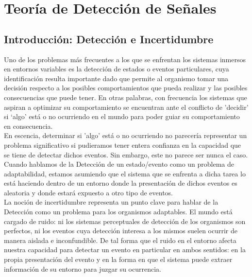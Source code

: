 
\chapter{Teoría de Detección de Señales} %

\label{Cap_SDT} %


\newcommand{\keyword}[1]{\textbf{#1}}
\newcommand{\tabhead}[1]{\textbf{#1}}
\newcommand{\code}[1]{\texttt{#1}}
\newcommand{\file}[1]{\texttt{\bfseries#1}}
\newcommand{\option}[1]{\texttt{\itshape#1}}


\section{Introducción: Detección e Incertidumbre}

Uno de los problemas más frecuentes a los que se enfrentan los sistemas inmersos en entornos variables es la detección de estados o eventos particulares, cuya identificación resulta importante dado que permite al organismo tomar una decisión respecto a los posibles comportamientos que pueda realizar y las posibles consecuencias que puede tener. En otras palabras, con frecuencia los sistemas que aspiran a optimizar su comportamiento se encuentran ante el conflicto de 'decidir' si ‘algo’ está o no ocurriendo en el mundo para poder guiar su comportamiento en consecuencia. \\

En escencia, determinar si 'algo' está o no ocurriendo no parecería representar un problema significativo si pudieramos tener entera confianza en la capacidad que se tiene de detectar dichos eventos. Sin embargo, este no parece ser nunca el caso. Cuando hablamos de la Detección de un estado/evento como un problema de adaptabilidad, estamos asumiendo que el sistema que se enfrenta a dicha tarea lo está haciendo dentro de un entorno donde la presentación de dichos eventos es aleatoria y donde estará expuesto a otro tipo de eventos.\\

La noción de incertidumbre representa un punto clave para hablar de la Detección como un problema para los organismos adaptables. El mundo está cargado de ruido: ni los sistemas perceptuales de detección de los organismos son perfectos, ni los eventos cuya detección interesa a los mismos suelen ocurrir de manera aislada e inconfundible. De tal forma que el ruido en el entorno afecta nuestra capacidad para detectar un evento en particular en ambos sentidos: en la propia presentación del evento y en la forma en que el sistema puede extraer información de su entorno para juzgar su ocurrencia.\\

